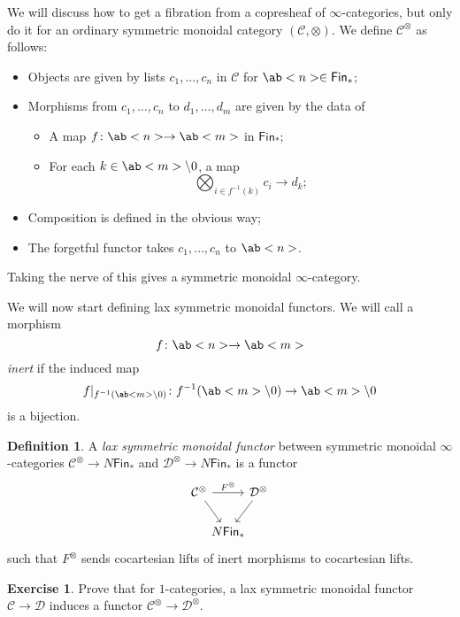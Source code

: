 \documentclass[10pt, oneside]{memoir}
\theoremstyle{definition}
\newtheorem{defn}[thm]{Definition}
\newtheorem{exer}[thm]{Exercise}
\theoremstyle{remark}
\theoremstyle{plain}
\theoremstyle{definition}
\theoremstyle{remark}
\newcommand{\mc}[1]{\mathcal{#1}}
\newcommand{\ms}[1]{\mathsf{#1}}
\newcommand{\1}{\mathbf{1}}
\newcommand{\2}{\mathbf{2}}
\newcommand{\3}{\mathbf{3}}
\begin{document}
We will discuss how to get a fibration from a copresheaf of $\infty$-categories, but only do it for an ordinary symmetric monoidal category $(\mc{C}, \otimes)$. We define $\mc{C}^{\otimes}$ as follows:
\begin{itemize}
    \item Objects are given by lists $c_1, \ldots, c_n$ in $\mc{C}$ for $\ab<n> \in \ms{Fin}_*$;
    \item Morphisms from $c_1, \ldots, c_n$ to $d_1, \ldots, d_m$ are given by the data of
    \begin{itemize}
        \item A map $f \colon \ab<n> \to \ab<m>$ in $\ms{Fin}_*$;
        \item For each $k \in \ab<m> \setminus 0$, a map
        \[ \bigotimes_{i \in f^{-1}(k)} c_i \to d_k; \]
    \end{itemize}
    \item Composition is defined in the obvious way;
    \item The forgetful functor takes $c_1, \ldots, c_n$ to $\ab<n>$.
\end{itemize}
Taking the nerve of this gives a symmetric monoidal $\infty$-category.

We will now start defining lax symmetric monoidal functors. We will call a morphism
\[ f \colon \ab<n> \to \ab<m> \]
\textit{inert} if the induced map
\[ f |_{f^{-1}(\ab<m> \setminus 0)} \colon f^{-1}(\ab<m> \setminus 0) \to \ab<m> \setminus 0 \]
is a bijection.

\begin{defn}
    A \textit{lax symmetric monoidal functor} between symmetric monoidal $\infty$-categories $\mc{C}^{\otimes} \to N\ms{Fin}_*$ and $\mc{D}^{\otimes} \to N\ms{Fin}_*$ is a functor
    \begin{equation*}
    \begin{tikzcd}[column sep=-0.5em]
        \mc{C}^{\otimes} \ar{rr}{F^{\otimes}} \ar{dr} & & \mc{D}^{\otimes} \ar{dl} \\
        & N\ms{Fin}_*
    \end{tikzcd}
    \end{equation*}
    such that $F^{\otimes}$ sends cocartesian lifts of inert morphisms to cocartesian lifts.
\end{defn}

\begin{exer}
    Prove that for $1$-categories, a lax symmetric monoidal functor $\mc{C} \to \mc{D}$ induces a functor $\mc{C}^{\otimes} \to \mc{D}^{\otimes}$.
\end{exer}
\end{document}
